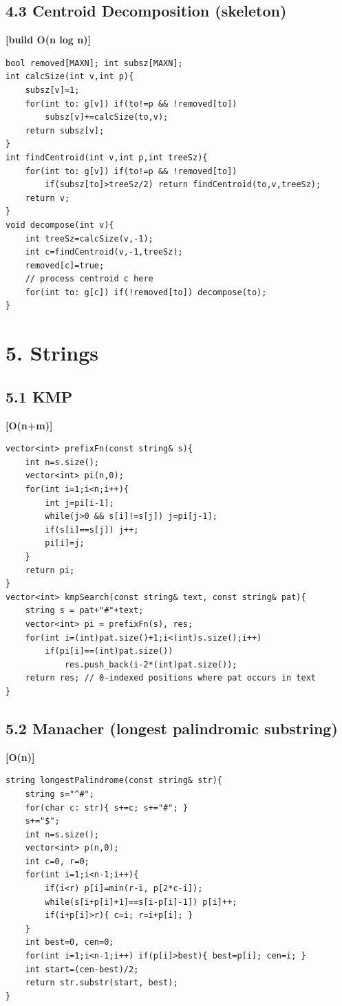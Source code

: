 \documentclass[11pt]{extarticle}
\newcommand{\comp}[1]{\textbf{[#1]}\\}
\begin{document}
\subsection*{4.3 Centroid Decomposition (skeleton)}
\comp{build O(n log n)}
\begin{lstlisting}
bool removed[MAXN]; int subsz[MAXN];
int calcSize(int v,int p){
    subsz[v]=1;
    for(int to: g[v]) if(to!=p && !removed[to])
        subsz[v]+=calcSize(to,v);
    return subsz[v];
}
int findCentroid(int v,int p,int treeSz){
    for(int to: g[v]) if(to!=p && !removed[to])
        if(subsz[to]>treeSz/2) return findCentroid(to,v,treeSz);
    return v;
}
void decompose(int v){
    int treeSz=calcSize(v,-1);
    int c=findCentroid(v,-1,treeSz);
    removed[c]=true;
    // process centroid c here
    for(int to: g[c]) if(!removed[to]) decompose(to);
}
\end{lstlisting}

\section*{5. Strings}
\subsection*{5.1 KMP}
\comp{O(n+m)}
\begin{lstlisting}
vector<int> prefixFn(const string& s){
    int n=s.size();
    vector<int> pi(n,0);
    for(int i=1;i<n;i++){
        int j=pi[i-1];
        while(j>0 && s[i]!=s[j]) j=pi[j-1];
        if(s[i]==s[j]) j++;
        pi[i]=j;
    }
    return pi;
}
vector<int> kmpSearch(const string& text, const string& pat){
    string s = pat+"#"+text;
    vector<int> pi = prefixFn(s), res;
    for(int i=(int)pat.size()+1;i<(int)s.size();i++)
        if(pi[i]==(int)pat.size())
            res.push_back(i-2*(int)pat.size());
    return res; // 0-indexed positions where pat occurs in text
}
\end{lstlisting}

\subsection*{5.2 Manacher (longest palindromic substring)}
\comp{O(n)}
\begin{lstlisting}
string longestPalindrome(const string& str){
    string s="^#";
    for(char c: str){ s+=c; s+="#"; }
    s+="$";
    int n=s.size();
    vector<int> p(n,0);
    int c=0, r=0;
    for(int i=1;i<n-1;i++){
        if(i<r) p[i]=min(r-i, p[2*c-i]);
        while(s[i+p[i]+1]==s[i-p[i]-1]) p[i]++;
        if(i+p[i]>r){ c=i; r=i+p[i]; }
    }
    int best=0, cen=0;
    for(int i=1;i<n-1;i++) if(p[i]>best){ best=p[i]; cen=i; }
    int start=(cen-best)/2;
    return str.substr(start, best);
}
\end{lstlisting}
\end{document}
